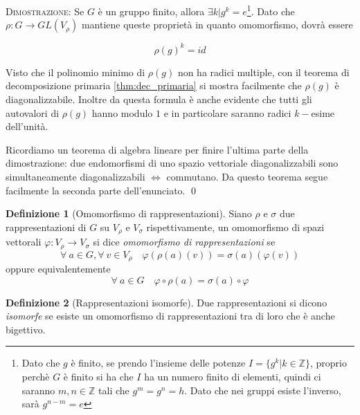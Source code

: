 \documentclass[11pt]{article}
\theoremstyle{plain}
\theoremstyle{definition}
\newtheorem{defn}{Definizione}[section]
\theoremstyle{remark}
\begin{document}
\textsc{Dimostrazione:} Se $G$ è un gruppo finito, allora $\exists k | g^k = e$\footnote{Dato che $g$ è finito, se prendo l'insieme delle potenze $I = \{g^k| k\in \mathbb{Z}\}$, proprio perchè $G$ è finito si ha che $I$ ha un numero finito di elementi, quindi ci saranno $m,n \in \mathbb{Z}$ tali che $g^m = g^n = h$. Dato che nei gruppi esiste l'inverso, sarà $g^{n-m} = e$}. Dato che $\rho:G\to GL(V_\rho)$ mantiene queste proprietà in quanto omomorfismo, dovrà essere

\[ \rho(g)^k = id\]

Visto che il polinomio minimo di $\rho(g)$ non ha radici multiple, con il teorema di decomposizione primaria \eqref{thm:dec_primaria} si mostra facilmente che $\rho(g)$ è diagonalizzabile. Inoltre da questa formula è anche evidente che tutti gli autovalori di $\rho(g)$ hanno modulo $1$ e in particolare saranno radici $k-$esime dell'unità.

Ricordiamo un teorema di algebra lineare per finire l'ultima parte della dimostrazione: due endomorfismi di uno spazio vettoriale diagonalizzabili sono simultaneamente diagonalizzabili $\Leftrightarrow$ commutano. Da questo teorema segue facilmente la seconda parte dell'enunciato. \qed





\begin{defn}[Omomorfismo di rappresentazioni]
Siano $\rho$ e $\sigma$ due rappresentazioni di $G$ su $V_{\rho}$ e $V_{\sigma}$ rispettivamente, un omomorfismo di spazi vettorali $\varphi:V_{\rho}\to V_{\sigma}$ si dice \textit{omomorfismo di rappresentazioni} se
\[
	\forall\ a\in G, \forall\ v\in V_{\rho}\quad \varphi(\rho(a)(v)) = \sigma(a)(\varphi(v))
\]
oppure equivalentemente
\[
	\forall\ a\in G\quad \varphi\circ \rho(a) = \sigma(a)\circ \varphi
\]






\end{defn}



\begin{defn}[Rappresentazioni isomorfe]
Due rappresentazioni si dicono \textit{isomorfe} se esiste un omomorfismo di rappresentazioni tra di loro che è anche bigettivo.
\end{defn}
\end{document}
